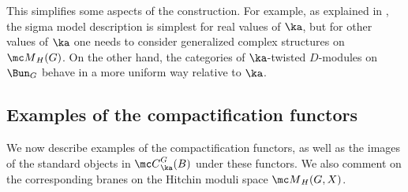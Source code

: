 \documentclass[11pt,reqno]{amsart}
\theoremstyle{plain}
\numberwithin{equation}{section}
\theoremstyle{definition}
\begin{document}
This simplifies some aspects of the construction. For example, as
explained in \cite{KW}, the sigma model description is simplest for
real values of $\ka$, but for other values of $\ka$ one needs to
consider generalized complex structures on ${\mc M}_H(G)$. On the
other hand, the categories of $\ka$-twisted $D$-modules on $\Bun_G$
behave in a more uniform way relative to $\ka$.

\subsection{Examples of the compactification functors}    \label{ex
  fun}

We now describe examples of the compactification functors, as well as
the images of the standard objects in ${\mc C}^G_\ka(B)$ under these
functors. We also comment on the corresponding branes on the Hitchin
moduli space ${\mc M}_H(G,X)$.

\medskip
\end{document}
